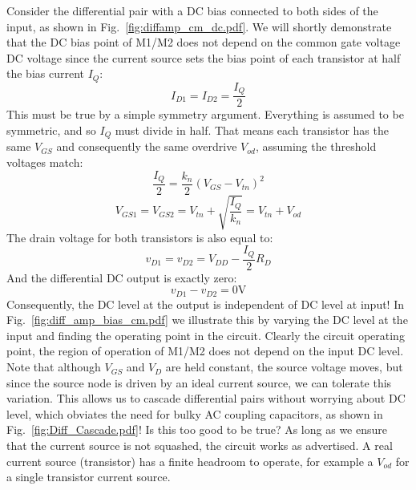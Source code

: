 Consider the differential pair with a DC bias connected to both sides of the input, as shown in Fig.~\ref{fig:diffamp_cm_dc.pdf}.  We will shortly demonstrate that the DC bias point of M1/M2 does not depend on the common gate voltage DC voltage since the current source sets the bias point of each transistor at half the bias current $I_Q$:
% 
\begin{equation} 
	{I_{D1}} = {I_{D2}} = \frac{I_Q}{2}
\end{equation}
%
This must be true by a simple symmetry argument. Everything is assumed to be symmetric, and so $I_Q$ must divide in half.  That means each transistor has the same $V_{GS}$ and consequently the same overdrive $V_{od}$, assuming the threshold voltages match:
% 
\begin{equation} 
	\frac{I_Q}{2} = \frac{{{k_n}}}{2}{\left( {{V_{GS}} - {V_{tn}}} \right)^2}
\end{equation}
%
\begin{equation}
 {V_{GS1}} = {V_{GS2}} = {V_{tn}} + \sqrt {\frac{I_Q}{{{k_n}}}}   = V_{tn} + V_{od}
\end{equation}
%
The drain voltage for both transistors is also equal to:
%
\begin{equation}
 {v_{D1}} = {v_{D2}} = {V_{DD}} - \frac{I_Q}{2}{R_D}  
\end{equation}
%
And the differential DC output is exactly zero:
\begin{equation}
 {v_{D1}} - {v_{D2}} = 0\mathrm{V}
\end{equation}
%
Consequently, the DC level at the output is independent of DC level at input! In Fig.~\ref{fig:diff_amp_bias_cm.pdf} we illustrate this by varying the DC level at the input and finding the operating point in the circuit.  Clearly the circuit operating point, the region of operation of M1/M2 does not depend on the input DC level.  Note that although $V_{GS}$ and $V_{D}$ are held constant, the source voltage moves, but since the source node is driven by an ideal current source, we can tolerate this variation.  This allows us to cascade differential pairs without worrying about DC level, which obviates the need for bulky AC coupling capacitors, as shown in Fig.~\ref{fig:Diff_Cascade.pdf}! Is this too good to be true?  As long as we ensure that the current source is not squashed, the circuit works as advertised.  A real current source (transistor) has a finite headroom to operate, for example a $V_{od}$ for a single transistor current source.
 


